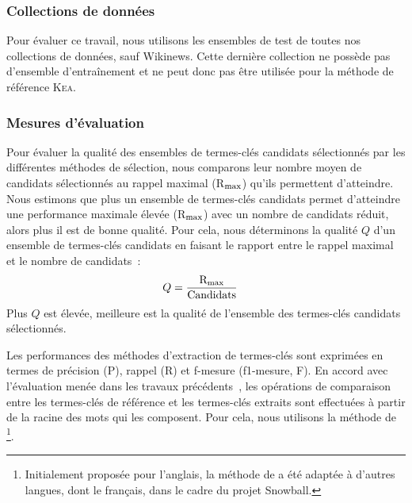       \subsubsection{Collections de données}
      \label{subsubsec:main:domain_independent_keyphrase_extraction-keyphrase_candidate_selection-evaluation-evaluation_data}
        Pour évaluer ce travail, nous utilisons les ensembles de test de toutes
        nos collections de données, sauf Wikinews. Cette dernière collection ne
        possède pas d'ensemble d'entraînement et ne peut donc pas être utilisée
        pour la méthode de référence \textsc{Kea}.
      
      \subsubsection{Mesures d'évaluation}
      \label{subsubsec:main:domain_independent_keyphrase_extraction-keyphrase_candidate_selection-evaluation-evaluation_measures}
        Pour évaluer la qualité des ensembles de termes-clés candidats
        sélectionnés par les différentes méthodes de sélection, nous comparons
        leur nombre moyen de candidats sélectionnés au rappel maximal
        (R$_\textnormal{max}$) qu'ils permettent d'atteindre. Nous estimons que
        plus un ensemble de termes-clés candidats permet d'atteindre une
        performance maximale élevée (R$_\textnormal{max}$) avec un nombre de
        candidats réduit, alors plus il est de bonne qualité. Pour cela, nous
        déterminons la qualité $Q$ d'un ensemble de termes-clés candidats en
        faisant le rapport entre le rappel maximal et le nombre de candidats~:
        \begin{align}
          Q &= \frac{\textnormal{R}_{\textnormal{max}}}{\textnormal{Candidats}}
        \end{align}
        Plus $Q$ est élevée, meilleure est la qualité de l'ensemble des
        termes-clés candidats sélectionnés.

        Les performances des méthodes d'extraction de termes-clés sont exprimées
        en termes de précision (P), rappel (R) et f-mesure (f1-mesure, F). En
        accord avec l'évaluation menée dans les travaux
        précédents~\cite{kim2010semeval}, les opérations de comparaison entre
        les termes-clés de référence et les termes-clés extraits sont effectuées
        à partir de la racine des mots qui les composent. Pour cela, nous
        utilisons la méthode de
        \footnote{Initialement proposée pour
        l'anglais, la méthode de  a été
        adaptée à d'autres langues, dont le français, dans le cadre du projet
        Snowball.}.

